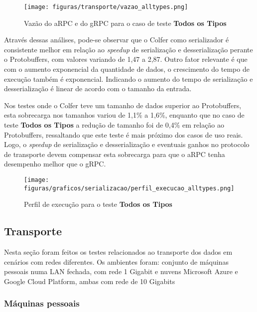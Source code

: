 \begin{figure}[!ht]
    \centering
    \caption{Vazão do aRPC e do gRPC para o caso de teste \textbf{Todos os Tipos}}
    \texttt{[image: figuras/transporte/vazao\_alltypes.png]} 
    \label{fig:vazao_alltypes}
\end{figure}

Através dessas análises, pode-se observar que o Colfer como serializador é consistente melhor em relação ao \textit{speedup} de serialização e desserialização perante o Protobuffers, com valores variando de 1,47 a 2,87. Outro fator relevante é que com o aumento exponencial da quantidade de dados, o crescimento do tempo de execução também é exponencial. Indicando o aumento do tempo de serialização e desserialização é linear de acordo com o tamanho da entrada.

Nos testes onde o Colfer teve um tamanho de dados superior ao Protobuffers, esta sobrecarga nos tamanhos variou de 1,1\% a 1,6\%, enquanto que no caso de teste \textbf{Todos os Tipos} a redução de tamanho foi de 0,4\% em relação ao Protobuffers, ressaltando que este teste é mais próximo dos casos de uso reais. Logo, o \textit{speedup} de serialização e desserialização e eventuais ganhos no protocolo de transporte devem compensar esta sobrecarga para que o aRPC tenha desempenho melhor que o gRPC.

\begin{figure}[ht]
    \centering
    \caption{Perfil de execução para o teste \textbf{Todos os Tipos}}
    \texttt{[image: figuras/graficos/serializacao/perfil\_execucao\_alltypes.png]} 
    \label{fig:perfil_execucao_alltypes}
\end{figure}

\subsection{Transporte}

Nesta seção foram feitos os testes relacionados ao transporte dos dados em cenários com redes diferentes. Os ambientes foram: conjunto de máquinas pessoais numa LAN fechada, com rede 1 Gigabit e nuvens Microsoft Azure e Google Cloud Platform, ambas com rede de 10 Gigabits

\subsubsection{Máquinas pessoais}
\label{subsubsection:maquinas_pessoais}

